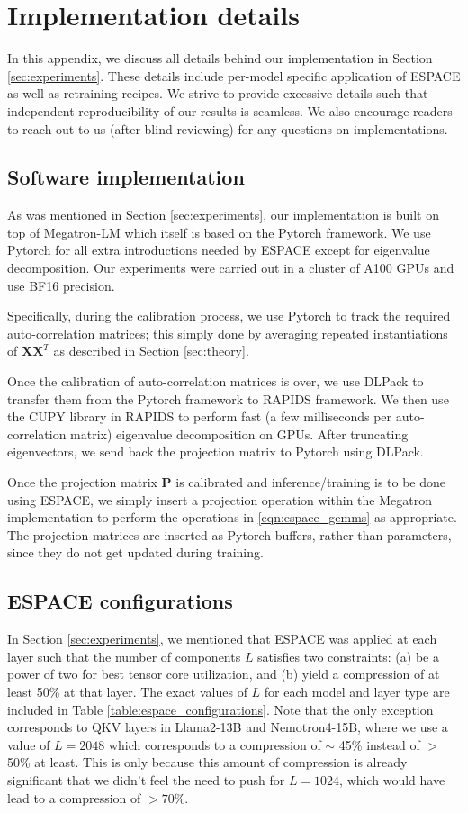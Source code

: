 \documentclass{article}
\theoremstyle{plain}
\begin{document}
\section{Implementation details}\label{app:implementation}
In this appendix, we discuss all details behind our implementation in Section \ref{sec:experiments}. These details include per-model specific application of ESPACE as well as retraining recipes. We strive to provide excessive details such that independent reproducibility of our results is seamless. We also encourage readers to reach out to us (after blind reviewing) for any questions on implementations.

\subsection{Software implementation}
As was mentioned in Section \ref{sec:experiments}, our implementation is built on top of Megatron-LM \cite{shoeybi2020megatronlm} which itself is based on the Pytorch framework. We use Pytorch for all extra introductions needed by ESPACE except for eigenvalue decomposition. Our experiments were carried out in a cluster of A100 GPUs and use BF16 precision.

Specifically, during the calibration process, we use Pytorch to track the required auto-correlation matrices; this simply done by averaging repeated instantiations of $\mathbf{X}\mathbf{X}^T$ as described in Section \ref{sec:theory}. 

Once the calibration of auto-correlation matrices is over, we use DLPack to transfer them from the Pytorch framework to RAPIDS framework. We then use the CUPY library in RAPIDS to perform fast (a few milliseconds per auto-correlation matrix) eigenvalue decomposition on GPUs. After truncating eigenvectors, we send back the projection matrix to Pytorch using DLPack.

Once the projection matrix $\mathbf{P}$ is calibrated and inference/training is to be done using ESPACE, we simply insert a projection operation within the Megatron implementation to perform the operations in \eqref{eqn:espace_gemms} as appropriate. The projection matrices are inserted as Pytorch buffers, rather than parameters, since they do not get updated during training.

\subsection{ESPACE configurations}\label{app:configurations}
In Section \ref{sec:experiments}, we mentioned that ESPACE was applied at each layer such that the number of components $L$ satisfies two constraints: (a) be a power of two for best tensor core utilization, and (b) yield a compression of at least 50\% at that layer. The exact values of $L$ for each model and layer type are included in Table \ref{table:espace_configurations}. Note that the only exception corresponds to QKV layers in Llama2-13B and Nemotron4-15B, where we use a value of $L=2048$ which corresponds to a compression of $\sim$ 45\% instead of $>$50\% at least. This is only because this amount of compression is already significant that we didn't feel the need to push for $L=1024$, which would have lead to a compression of $>70\%$.
\end{document}
